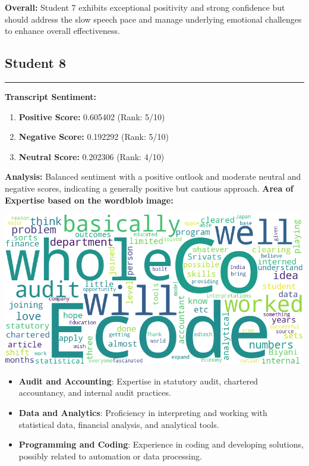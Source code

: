 \documentclass{article}
\begin{document}
\textbf{Overall:} Student 7 exhibits exceptional positivity and strong confidence but should address the slow speech pace and manage underlying emotional challenges to enhance overall effectiveness.

\vspace{0.3in}
\subsection{Student 8}
\begin{center}
    \color{green}\rule{1\linewidth}{0.7mm}
\end{center}

\large{\textbf{Transcript Sentiment:}}
\begin{tcolorbox}[ colback=purple!5!white,colframe=purple!75!black,  ,title=Sentiment Breakdown]
    \begin{enumerate}
        \item \textbf{Positive Score:} \textcolor{green!70!black}{0.605402} (Rank: 5/10)
        \item \textbf{Negative Score:} \textcolor{red!70!black}{0.192292} (Rank: 5/10)
        \item \textbf{Neutral Score:} \textcolor{blue!70!black}{0.202306} (Rank: 4/10)
    \end{enumerate}
\end{tcolorbox}
\textbf{Analysis:} Balanced sentiment with a positive outlook and moderate neutral and negative scores, indicating a generally positive but cautious approach.
\vspace{0.3in}
\LARGE \textbf{Area of Expertise based on the wordblob image:} \normalsize
\begin{center}
    \includegraphics[width=1\columnwidth]{images/wordcloud_8.png}
\end{center}

\begin{itemize}
    \item \textbf{Audit and Accounting}: Expertise in statutory audit, chartered accountancy, and internal audit practices.
    \item \textbf{Data and Analytics}: Proficiency in interpreting and working with statistical data, financial analysis, and analytical tools.
    \item \textbf{Programming and Coding}: Experience in coding and developing solutions, possibly related to automation or data processing.
\end{itemize}
\end{document}
